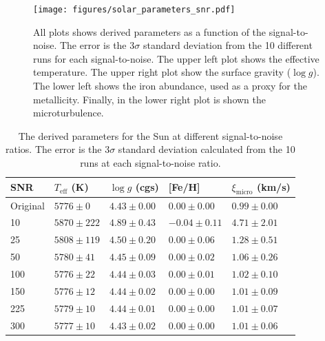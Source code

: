 \documentclass{aa}
\begin{document}
\begin{figure}[tbp!]
    \centering
    \texttt{[image: figures/solar\_parameters\_snr.pdf]}
    \caption{All plots shows derived parameters as a function of the
    signal-to-noise. The error is the 3$\sigma$ standard deviation from
    the 10 different runs for each signal-to-noise. The upper left plot
    shows the effective temperature. The upper right plot show the surface
    gravity ($\log g$). The lower left shows the iron abundance, used as a
    proxy for the metallicity. Finally, in the lower right plot is shown
    the microturbulence.}
    \label{fig:snr_sun}
\end{figure}

\begin{table}[htb!]
    \caption{The derived parameters for the Sun at different signal-to-noise
    ratios. The error is the 3$\sigma$ standard deviation calculated from
    the 10 runs at each signal-to-noise ratio.}
    \label{tab:solar_params}
    \centering
    \begin{tabular}{lllll}
      \hline\hline
        SNR & $T_\mathrm{eff}$ (K) & $\log g$ (cgs)  &       [Fe/H]     & $\xi_\mathrm{micro}$ (km/s)  \\
      \hline
  Original  &  $5776 \pm 0$        & $4.43 \pm 0.00$ & $0.00 \pm 0.00$  & $0.99 \pm 0.00$              \\
      \hline
        10  &  $5870 \pm 222$      & $4.89 \pm 0.43$ & $-0.04 \pm 0.11$ & $4.71 \pm 2.01$              \\
        25  &  $5808 \pm 119$      & $4.50 \pm 0.20$ & $0.00 \pm 0.06$  & $1.28 \pm 0.51$              \\
        50  &  $5780 \pm 41$       & $4.45 \pm 0.09$ & $0.00 \pm 0.02$  & $1.06 \pm 0.26$              \\
       100  &  $5776 \pm 22$       & $4.44 \pm 0.03$ & $0.00 \pm 0.01$  & $1.02 \pm 0.10$              \\
       150  &  $5776 \pm 12$       & $4.44 \pm 0.02$ & $0.00 \pm 0.00$  & $1.01 \pm 0.09$              \\
       225  &  $5779 \pm 10$       & $4.44 \pm 0.01$ & $0.00 \pm 0.00$  & $1.01 \pm 0.07$              \\
       300  &  $5777 \pm 10$       & $4.43 \pm 0.02$ & $0.00 \pm 0.00$  & $1.01 \pm 0.06$              \\
      \hline
    \end{tabular}
\end{table}
\end{document}
